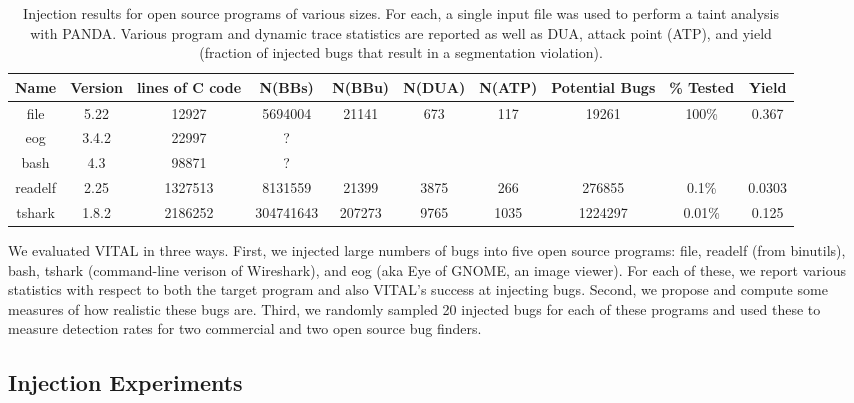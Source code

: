 
\label{section:results}

\begin{table}[t!]
\centering
\begin{tabular}{c|c|c|c|c|c|c|c|c|c} 
Name    & Version & lines of C code & N(BBs)     & N(BBu)   &  N(DUA) & N(ATP) & Potential Bugs & \% Tested & Yield \\\hline
file    & 5.22    & 12927           & 5694004    & 21141    & 673     & 117    & 19261          & 100\%     & 0.367  \\
eog     & 3.4.2   & 22997           & ?          &          &         &        &                &           & \\
bash    & 4.3     & 98871           & ?          &          &         &        &                &           & \\
readelf & 2.25    & 1327513         & 8131559    & 21399    & 3875    & 266    & 276855         & 0.1\%     & 0.0303 \\
tshark  & 1.8.2   & 2186252         & 304741643  & 207273   & 9765    & 1035   & 1224297        & 0.01\%    & 0.125 \\
\end{tabular}
\caption{Injection results for open source programs of various sizes.
For each, a single input file was used to perform a taint analysis with PANDA.
Various program and dynamic trace statistics are reported as well as DUA, attack point (ATP), and yield (fraction of injected bugs that result in a segmentation violation).}
\end{table}

We evaluated VITAL in three ways.
First, we injected large numbers of bugs into five open source programs: file, readelf (from binutils), bash, tshark (command-line verison of Wireshark), and eog (aka Eye of GNOME, an image viewer).
For each of these, we report various statistics with respect to both the target program and also VITAL's success at injecting bugs.
Second, we propose and compute some measures of how realistic these bugs are.
Third, we randomly sampled 20 injected bugs for each of these programs and used these to measure detection rates for two commercial and two open source bug finders.

\subsection{Injection Experiments}



